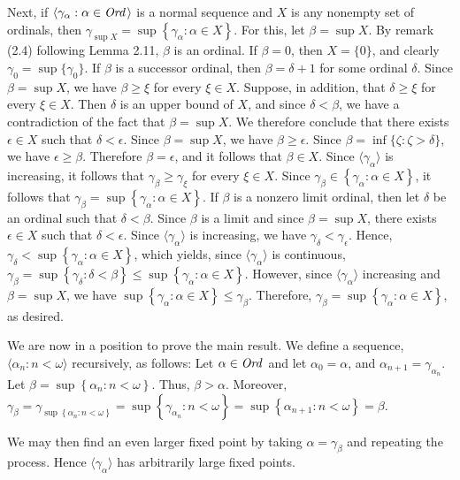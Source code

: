 \begin{solution}
Next, if $\langle \gamma_{\alpha} : \alpha \in \textit{Ord\,} \rangle$ is a normal 
sequence and $X$ is any nonempty set of ordinals, then 
$\gamma_{\sup X} = \sup \left \{ \gamma_{\alpha} : \alpha \in X \right \}$. For 
this, let $\beta = \sup X$. By remark (2.4) following Lemma 2.11, $\beta$ is an 
ordinal. If $\beta = 0$, then $X = \{ 0 \}$, and clearly 
$\gamma_0 = \sup \{ \gamma_0 \}$. If $\beta$ is a successor ordinal, then 
$\beta = \delta + 1$ for some ordinal $\delta$. Since $\beta = \sup X$, we have 
$\beta \geq \xi$ for every $\xi \in X$. Suppose, in addition, that 
$\delta \geq \xi$ for every $\xi \in X$. Then $\delta$ is an upper bound of 
$X$, and since $\delta < \beta$, we have a contradiction of the fact that 
$\beta = \sup X$. We therefore conclude that there exists $\epsilon \in X$ such 
that $\delta < \epsilon$. Since $\beta = \sup X$, we have 
$\beta \geq \epsilon$. Since $\beta = \inf \{ \zeta : \zeta > \delta \}$, we 
have $\epsilon \geq \beta$. Therefore $\beta = \epsilon$, and it follows that 
$\beta \in X$. Since $\langle \gamma_{\alpha} \rangle$ is increasing, it 
follows that $\gamma_{\beta} \geq \gamma_{\xi}$ for every $\xi \in X$. Since 
$\gamma_{\beta} \in \left \{ \gamma_{\alpha} : \alpha \in X \right \}$, it 
follows that 
$\gamma_{\beta} = \sup \left \{ \gamma_{\alpha} : \alpha \in X \right \}$. If 
$\beta$ is a nonzero limit ordinal, then let $\delta$ be an ordinal such that 
$\delta < \beta$. Since $\beta$ is a limit and since $\beta = \sup X$, there 
exists $\epsilon \in X$ such that $\delta < \epsilon$. Since 
$\langle \gamma_{\alpha} \rangle$ is increasing, we have 
$\gamma_{\delta} < \gamma_{\epsilon}$. Hence, 
$\gamma_{\delta} < \sup \left \{ \gamma_{\alpha} : \alpha \in X \right \}$, 
which yields, since $\langle \gamma_{\alpha} \rangle$ is continuous, 
$\gamma_{\beta} = \sup \left \{ \gamma_{\delta} : \delta < \beta \right \} \leq 
\sup \left \{ \gamma_{\alpha} : \alpha \in X \right \}$. However, since 
$\langle \gamma_{\alpha} \rangle$ increasing and $\beta = \sup X$, we have 
$\sup \left \{ \gamma_{\alpha} : \alpha \in X \right \} \leq \gamma_{\beta}$. 
Therefore, 
$\gamma_{\beta} = \sup \left \{ \gamma_{\alpha} : \alpha \in X \right \}$, as 
desired.

We are now in a position to prove the main result. We define a sequence, 
$\langle \alpha_n : n < \omega \rangle$ recursively, as follows: Let 
$\alpha \in \textit{Ord\,}$ and let $\alpha_0 = \alpha$, and 
$\alpha_{n + 1} = \gamma_{\alpha_n}$. Let 
$\beta = \sup \left \{ \alpha_n : n < \omega \right \}$. Thus, 
$\beta > \alpha$. Moreover, 
$\gamma_{\beta} = \gamma_{\sup \left \{ \alpha_n : n < \omega \right \}} = \sup 
\left \{ \gamma_{\alpha_n} : n < \omega \right \} = \sup \left \{ 
\alpha_{n + 1} : n < \omega \right \} = \beta$.

We may then find an even larger fixed point by taking 
$\alpha = \gamma_{\beta}$ and repeating the process. Hence 
$\langle \gamma_{\alpha} \rangle$ has arbitrarily large fixed points.
\end{solution}